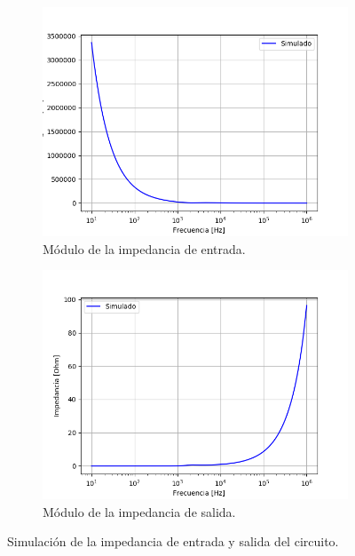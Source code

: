 \begin{figure}[H]
	\centering
	\begin{subfigure}[t]{0.49\textwidth}
	\hspace*{-2cm}
	\centering
		\includegraphics[width=1.1\textwidth]{Imagenes1/sim_zin.png}
		\caption{Módulo de la impedancia de entrada.}
	\end{subfigure}
	\begin{subfigure}[t]{0.49\textwidth}
	\centering
		\includegraphics[width=1.1\textwidth]{Imagenes1/sim_zout.png}
		\caption{Módulo de la impedancia de salida.}
	\end{subfigure}
	\label{fig:zin_zout}
	\caption{Simulación de la impedancia de entrada y salida del circuito.}
\end{figure}

